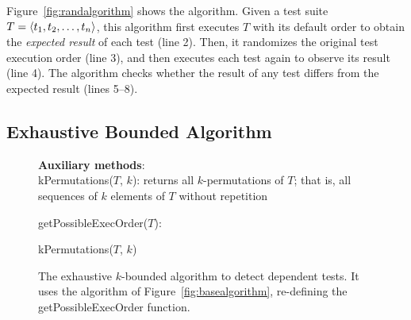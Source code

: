 Figure~\ref{fig:randalgorithm} shows the algorithm.
Given a test suite $T =  \langle t_1, t_2, \ldots, t_n \rangle $, this algorithm
first executes $T$ with its default order
to obtain the \emph{expected result} of each test (line 2).
Then, it randomizes the original
test execution order (line 3), and then executes each test
again to observe its result (line 4). The algorithm checks
whether the result of any test differs from the
expected result (lines 5--8). 





\subsection{Exhaustive Bounded Algorithm}
\label{sec:basic}

\begin{figure}[t]
\textbf{Auxiliary methods}:\\
kPermutations($T$, $k$): returns all $k$-permutations of $T$; that is, all
sequences of $k$ elements of $T$ without repetition

\medskip

getPossibleExecOrder($T$):\\
\vspace{-5mm}
\begin{algorithmic}[1]
\RETURN kPermutations($T$, $k$)
\end{algorithmic}

\vspace{-3mm}
\caption {The exhaustive $k$-bounded algorithm to detect dependent tests.
It uses the algorithm of Figure~\ref{fig:basealgorithm}, re-defining the
getPossibleExecOrder function.
} 
\label{fig:exhaustivealgorithm}
\end{figure}


